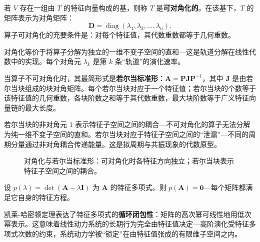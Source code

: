 \begin{definition}[可对角化算子]\label{def:diagonalisable}
若 $V$ 存在一组由 $T$ 的特征向量构成的基，则称 $T$ 是\textbf{可对角化的}。在该基下，$T$ 的矩阵表示为对角矩阵：
\[
\mathbf{D} = \operatorname{diag}(\lambda_1, \lambda_2, \dots, \lambda_n).
\]
算子可对角化的充要条件是：对每个特征值，其代数重数都等于几何重数。

对角化等价于将算子分解为独立的一维不变子空间的直和---这是轨道分解在线性代数中的实现。每个对角元 $\lambda_k$ 是第 $k$ 条“轨道”的演化速率。
\end{definition}

\begin{definition}[若尔当标准形]\label{def:jordan_form}
当算子不可对角化时，其最简形式是\textbf{若尔当标准形}：$\mathbf{A} = \mathbf{P} \mathbf{J} \mathbf{P}^{-1}$，其中 $\mathbf{J}$ 是由若尔当块组成的块对角矩阵。每个若尔当块对应于一个特征值；若尔当块的个数等于该特征值的几何重数，各块阶数之和等于其代数重数，最大块阶数等于广义特征向量链的最大长度。

若尔当块的非对角元 $1$ 表示特征子空间之间的耦合---不可对角化的算子无法分解为纯一维不变子空间的直和。若尔当块对应于特征子空间之间的“泄漏”---不同的周期分量通过非对角耦合传递能量。这是拟周期与共振现象的代数原型。
\end{definition}

\begin{figure}[htbp]
\centering
{}
\caption{对角化与若尔当标准形：可对角化时各特征方向独立；若尔当块表示特征子空间之间的耦合。}
\label{fig:diagonal_jordan}
\end{figure}

\begin{theorem}[凯莱-哈密顿定理]\label{thm:cayley_hamilton}
设 $p(\lambda) = \det(\mathbf{A} - \lambda \mathbf{I})$ 为 $\mathbf{A}$ 的特征多项式。则 $p(\mathbf{A}) = \mathbf{0}$---每个矩阵都满足它自身的特征方程。

凯莱-哈密顿定理表达了特征多项式的\textbf{循环闭包性}：矩阵的高次幂可线性地用低次幂表示。这意味着线性动力系统的长期行为完全由特征值决定---高阶演化受特征多项式次数的约束，系统动力学被“锁定”在由特征值张成的有限维子空间之内。
\end{theorem}

